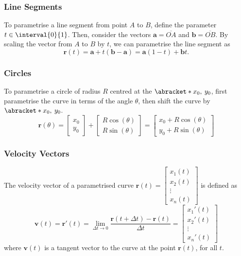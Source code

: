 \documentclass{article}
\begin{document}
\subsubsection{Line Segments}
To parametrise a line segment from point \(A\) to \(B\), define the
parameter \(t \in \interval{0}{1}\). Then, consider the vectors
\(\symbf{a} = \overline{OA}\) and \(\symbf{b} = \overline{OB}\). By
scaling the vector from \(A\) to \(B\) by \(t\), we can parametrise the
line segment as
\begin{equation*}
    \symbf{r}\left( t \right) = \symbf{a} + t \left( \symbf{b} - \symbf{a} \right) = \symbf{a} \left( 1 - t \right) + \symbf{b} t.
\end{equation*}
\subsubsection{Circles}
To parametrise a circle of radius \(R\) centred at the
\(\abracket*{x_0,\: y_0}\), first parametrise the curve in terms of the
angle \(\theta\), then shift the curve by \(\abracket*{x_0,\: y_0}\).
\begin{equation*}
    \symbf{r}\left( \theta \right) =
    \begin{bmatrix}
        x_0 \\
        y_0
    \end{bmatrix}
    +
    \begin{bmatrix}
        R \cos{\left( \theta \right)} \\
        R \sin{\left( \theta \right)}
    \end{bmatrix}
    =
    \begin{bmatrix}
        x_0 + R \cos{\left( \theta \right)} \\
        y_0 + R \sin{\left( \theta \right)}
    \end{bmatrix}
\end{equation*}
\subsubsection{Velocity Vectors}
The velocity vector of a parametrised curve \(\symbf{r}\left( t \right)
=
\begin{bmatrix}
    x_1\left( t \right) \\
    x_2\left( t \right) \\
    \vdots              \\
    x_n\left( t \right)
\end{bmatrix}
\) is defined as
\begin{equation*}
    \symbf{v}\left( t \right) = \symbf{r}'\left( t \right) = \lim_{\Delta t \to 0} \frac{\symbf{r}\left( t + \Delta t \right) - \symbf{r}\left( t \right)}{\Delta t} =
    \begin{bmatrix}
        x_1'\left( t \right) \\
        x_2'\left( t \right) \\
        \vdots               \\
        x_n'\left( t \right)
    \end{bmatrix}
\end{equation*}
where \(\symbf{v}\left( t \right)\) is a tangent vector to the curve at the point \(\symbf{r}\left( t \right)\), for all \(t\).
\end{document}
